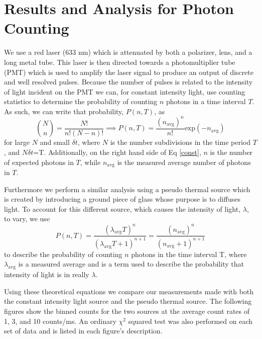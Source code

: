 \documentclass[prb,preprint]{revtex4-1}
\begin{document}
\section{Results and Analysis for Photon Counting}

We use a red laser (633 nm) which is attenuated by both a polarizer, lens, and a long metal tube. This laser is then directed towards a photomultiplier tube (PMT) which is used to amplify the laser signal to produce an output of discrete and well resolved pulses. Because the number of pulses is related to the intensity of light incident on the PMT we can, for constant intensity light, use counting statistics to determine the probability of counting $n$ photons in a time interval $T$. As such, we can write that probability, $P(n,T)$, as
\begin{equation}\label{const}
\binom{N}{n}=\frac{N!}{n!(N-n)!} \implies P(n,T)=\frac{(n_{\text{avg}})^{n}}{n!}\text{exp}(-n_{\text{avg}})
\end{equation}
for large $N$ and small $\delta t$, where $N$ is the number subdivisions in the time period $T$, and $N\delta t$=T. Additionally, on the right hand side of Eq \ref{const}, $n$ is the number of expected photons in $T$, while $n_\text{avg}$ is the measured average number of photons in $T$.

Furthermore we perform a similar analysis using a pseudo thermal source which is created by introducing a ground piece of glass whose purpose is to diffuses light. To account for this different source, which causes the intensity of light, $\lambda$, to vary, we use
\begin{equation}\label{pseudo}
P(n,T) = \frac{(\lambda_{\text{avg}}T)^n}{(\lambda_{\text{avg}}T+1)^{n+1}} = \frac{(n_{\text{avg}})^n}{(n_{\text{avg}}+1)^{n+1}}
\end{equation}
to describe the probability of counting $n$ photons in the time interval T, where $\lambda_\text{avg}$ is a measured average and is a term used to describe the probability that intensity of light is in really $\lambda$.

Using these theoretical equations we compare our measurements made with both the constant intensity light source and the pseudo thermal source. The following figures show the binned counts for the two sources at the average count rates of 1, 3, and 10 counts/ms. An ordinary $\chi^2$ squared test was also performed on each set of data and is listed in each figure's description.

\newpage
\end{document}
